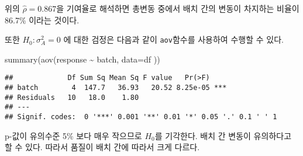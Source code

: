 \documentclass[
]{book}
\newenvironment{Shaded}{\begin{snugshade}}{\end{snugshade}}
\newcommand{\AttributeTok}[1]{\textcolor[rgb]{0.77,0.63,0.00}{#1}}
\newcommand{\FunctionTok}[1]{\textcolor[rgb]{0.00,0.00,0.00}{#1}}
\newcommand{\NormalTok}[1]{#1}
\newcommand{\SpecialCharTok}[1]{\textcolor[rgb]{0.00,0.00,0.00}{#1}}
\theoremstyle{definition}
\theoremstyle{definition}
\theoremstyle{definition}
\theoremstyle{remark}
\begin{document}
위의 \(\hat \rho=0.867\)을 기여율로 해석하면 총변동 중에서 배치 간의 변동이 차지하는 비율이 86.7\% 이라는 것이다.

또한 \(H_0: \sigma_A^2=0\) 에 대한 검정은 다음과 같이 \texttt{aov}함수를 사용하여 수행할 수 있다.

\begin{Shaded}
\begin{Highlighting}[]
\FunctionTok{summary}\NormalTok{(}\FunctionTok{aov}\NormalTok{(response }\SpecialCharTok{\textasciitilde{}}\NormalTok{ batch, }\AttributeTok{data=}\NormalTok{df ))}
\end{Highlighting}
\end{Shaded}

\begin{verbatim}
##             Df Sum Sq Mean Sq F value   Pr(>F)    
## batch        4  147.7   36.93   20.52 8.25e-05 ***
## Residuals   10   18.0    1.80                     
## ---
## Signif. codes:  0 '***' 0.001 '**' 0.01 '*' 0.05 '.' 0.1 ' ' 1
\end{verbatim}

p-값이 유의수준 5\% 보다 매우 작으므로 \(H_0\)를 기각한다. 배치 간 변동이 유의하다고 할 수 있다. 따라서 품질이 배치 간에 따라서 크게 다르다.

  
\end{document}
